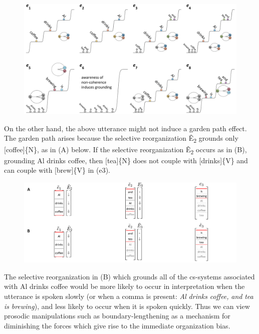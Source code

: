   
\begin{figure}
\includegraphics[width=\textwidth]{figures/Tilsen-img130.png}
\caption{\missingcaption}
\label{fig:}
\end{figure}
 

  On the other hand, the above utterance might not induce a garden path effect. The garden path arises because the selective reorganization Ê\textsubscript{2} grounds only [coffee]\{N\}, as in (A) below. If the selective reorganization Ê\textsubscript{2} occurs as in (B), grounding {\textbar}Al drinks coffee{\textbar}, then [tea]\{N\} does not couple with [drinks]\{V\} and can couple with [brew]\{V\} in (e3).

  
\begin{figure}
\includegraphics[width=\textwidth]{figures/Tilsen-img131.png}
\caption{\missingcaption}
\label{fig:}
\end{figure}
 

  The selective reorganization in (B) which grounds all of the cs-systems associated with {\textbar}Al drinks coffee{\textbar} would be more likely to occur in interpretation when the utterance is spoken slowly (or when a comma is present: \textit{Al} \textit{drinks} \textit{coffee,} \textit{and} \textit{tea} \textit{is} \textit{brewing}), and less likely to occur when it is spoken quickly. Thus we can view prosodic manipulations such as boundary-lengthening as a mechanism for diminishing the forces which give rise to the immediate organization bias.

